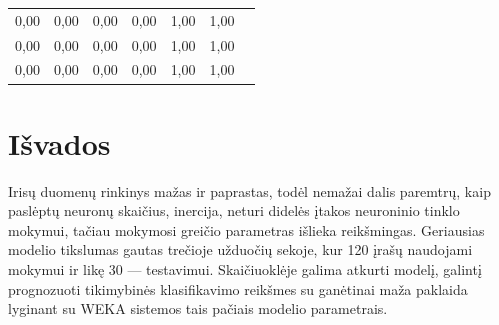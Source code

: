 \documentclass{VUMIFPSbakalaurinis}
\begin{document}
\begin{table}[]
{\begin{tabular}{|cc|cc|cc|l}
        \multicolumn{1}{|c|}{0,00}                & 0,00                 & \multicolumn{1}{c|}{0,00}                & 0,00                 & \multicolumn{1}{c|}{1,00}                & 1,00                 &  \\ \cline{1-6}
        \multicolumn{1}{|c|}{0,00}                & 0,00                 & \multicolumn{1}{c|}{0,00}                & 0,00                 & \multicolumn{1}{c|}{1,00}                & 1,00                 &  \\ \cline{1-6}
        \multicolumn{1}{|c|}{0,00}                & 0,00                 & \multicolumn{1}{c|}{0,00}                & 0,00                 & \multicolumn{1}{c|}{1,00}                & 1,00                 &  \\ \cline{1-6}
        \end{tabular}}
  \label{tab:tikimybes}
\end{table}

\section{Išvados}
Irisų duomenų rinkinys mažas ir paprastas, todėl
nemažai dalis paremtrų, kaip paslėptų neuronų skaičius,
inercija, neturi didelės įtakos neuroninio tinklo mokymui,
tačiau mokymosi greičio parametras išlieka reikšmingas. 
Geriausias modelio tikslumas gautas trečioje užduočių sekoje,
kur 120 įrašų naudojami mokymui ir likę 30 — testavimui.
Skaičiuoklėje galima atkurti modelį, galintį prognozuoti
tikimybinės klasifikavimo reikšmes su ganėtinai maža
paklaida lyginant su WEKA sistemos tais pačiais modelio parametrais.
\end{document}
